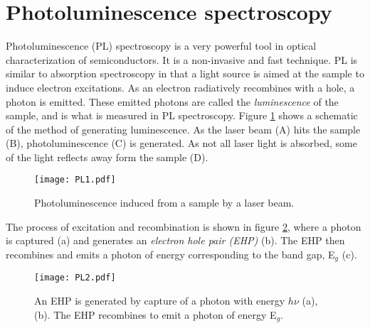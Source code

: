 			
			
		

	
\section{Photoluminescence spectroscopy}
\label{sec:pl}
Photoluminescence (PL) spectroscopy is a very powerful tool in optical characterization of semiconductors. It is a non-invasive and fast technique. PL is similar to absorption spectroscopy in that a light source is aimed at the sample to induce electron excitations. As an electron radiatively recombines with a hole, a photon is emitted. These emitted photons are called the \emph{luminescence} of the sample, and is what is measured in PL spectroscopy. Figure \ref{fig:pl1} shows a schematic of the method of generating luminescence. As the laser beam (A) hits the sample (B), photoluminescence (C) is generated. As not all laser light is absorbed, some of the light reflects away form the sample (D). 

\begin{figure}[h]
\begin{center}
\texttt{[image: PL1.pdf]}
\caption{Photoluminescence induced from a sample by a laser beam. 
\label{fig:pl1}}
\end{center}
\end{figure}

The process of excitation and recombination is shown in figure \ref{fig:pl2}, where a photon is captured (a) and generates an \emph{electron hole pair (EHP)} (b). The EHP then recombines and emits a photon of energy corresponding to the band gap, E$_g$ (c). 

\begin{figure}[h]
\begin{center}
\texttt{[image: PL2.pdf]}
\caption{An EHP is generated by capture of a photon with energy $h\nu$ (a), (b). The EHP recombines to emit a photon of energy E$_g$.
\label{fig:pl2}}
\end{center}
\end{figure}

